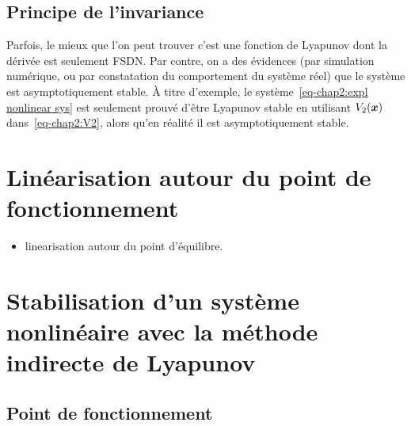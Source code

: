 \subsection{Principe de l'invariance}
Parfois, le mieux que l'on peut trouver c'est une fonction de Lyapunov dont la dérivée est seulement FSDN. Par contre, on a des évidences (par simulation numérique, ou par constatation du comportement du système réel) que le système est asymptotiquement stable. À titre d'exemple, le système~\eqref{eq-chap2:expl nonlinear sys} est seulement prouvé d'être Lyapunov stable en utilisant $V_2(\bm{x})$dans~\eqref{eq-chap2:V2}, alors qu'en réalité il est asymptotiquement stable. 
\section{Linéarisation autour du point de fonctionnement}

\begin{itemize}
	\item linearisation autour du point d'équilibre.
\end{itemize}


\section{Stabilisation d'un système nonlinéaire avec la méthode indirecte de Lyapunov}
\subsection{Point de fonctionnement}